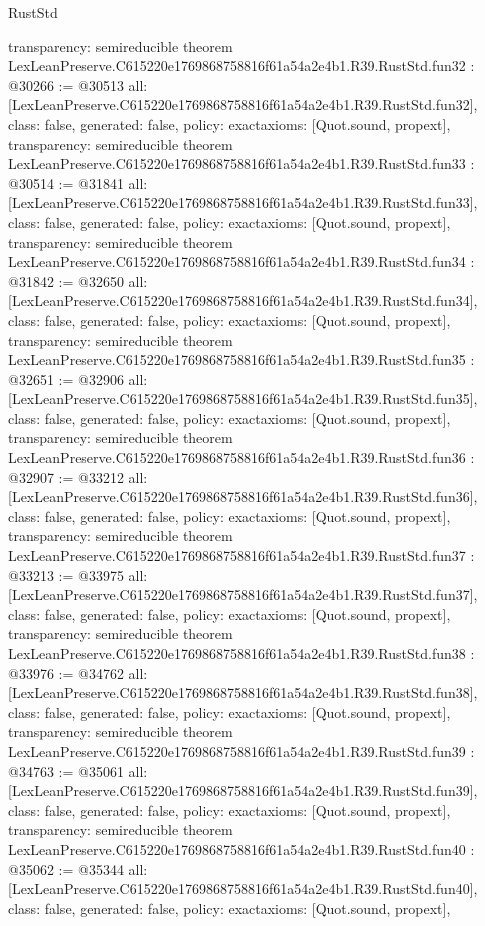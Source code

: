 \begin{lexlean}{RustStd}
\begin{coremodule}
{  transparency: semireducible
}
theorem LexLeanPreserve.C615220e1769868758816f61a54a2e4b1.R39.RustStd.fun32 : @30266 := @30513 {
  all: [LexLeanPreserve.C615220e1769868758816f61a54a2e4b1.R39.RustStd.fun32],
  class: false,
  generated: false,
  policy: exact{axioms: [Quot.sound, propext]},
  transparency: semireducible
}
theorem LexLeanPreserve.C615220e1769868758816f61a54a2e4b1.R39.RustStd.fun33 : @30514 := @31841 {
  all: [LexLeanPreserve.C615220e1769868758816f61a54a2e4b1.R39.RustStd.fun33],
  class: false,
  generated: false,
  policy: exact{axioms: [Quot.sound, propext]},
  transparency: semireducible
}
theorem LexLeanPreserve.C615220e1769868758816f61a54a2e4b1.R39.RustStd.fun34 : @31842 := @32650 {
  all: [LexLeanPreserve.C615220e1769868758816f61a54a2e4b1.R39.RustStd.fun34],
  class: false,
  generated: false,
  policy: exact{axioms: [Quot.sound, propext]},
  transparency: semireducible
}
theorem LexLeanPreserve.C615220e1769868758816f61a54a2e4b1.R39.RustStd.fun35 : @32651 := @32906 {
  all: [LexLeanPreserve.C615220e1769868758816f61a54a2e4b1.R39.RustStd.fun35],
  class: false,
  generated: false,
  policy: exact{axioms: [Quot.sound, propext]},
  transparency: semireducible
}
theorem LexLeanPreserve.C615220e1769868758816f61a54a2e4b1.R39.RustStd.fun36 : @32907 := @33212 {
  all: [LexLeanPreserve.C615220e1769868758816f61a54a2e4b1.R39.RustStd.fun36],
  class: false,
  generated: false,
  policy: exact{axioms: [Quot.sound, propext]},
  transparency: semireducible
}
theorem LexLeanPreserve.C615220e1769868758816f61a54a2e4b1.R39.RustStd.fun37 : @33213 := @33975 {
  all: [LexLeanPreserve.C615220e1769868758816f61a54a2e4b1.R39.RustStd.fun37],
  class: false,
  generated: false,
  policy: exact{axioms: [Quot.sound, propext]},
  transparency: semireducible
}
theorem LexLeanPreserve.C615220e1769868758816f61a54a2e4b1.R39.RustStd.fun38 : @33976 := @34762 {
  all: [LexLeanPreserve.C615220e1769868758816f61a54a2e4b1.R39.RustStd.fun38],
  class: false,
  generated: false,
  policy: exact{axioms: [Quot.sound, propext]},
  transparency: semireducible
}
theorem LexLeanPreserve.C615220e1769868758816f61a54a2e4b1.R39.RustStd.fun39 : @34763 := @35061 {
  all: [LexLeanPreserve.C615220e1769868758816f61a54a2e4b1.R39.RustStd.fun39],
  class: false,
  generated: false,
  policy: exact{axioms: [Quot.sound, propext]},
  transparency: semireducible
}
theorem LexLeanPreserve.C615220e1769868758816f61a54a2e4b1.R39.RustStd.fun40 : @35062 := @35344 {
  all: [LexLeanPreserve.C615220e1769868758816f61a54a2e4b1.R39.RustStd.fun40],
  class: false,
  generated: false,
  policy: exact{axioms: [Quot.sound, propext]},
}
\end{coremodule}
\end{lexlean}
